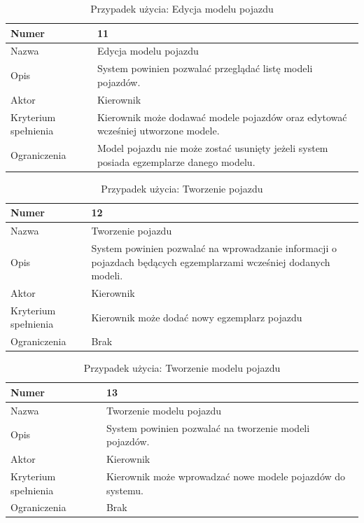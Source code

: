 \documentclass[eng,printmode,openany]{mgr}
\begin{document}
	\begin{table}[H]
		\caption{Przypadek użycia: Edycja modelu pojazdu}
		\begin{tabularx}{\textwidth}{|l|X|}
			\hline
			Numer                & 11  \\ \hline
			Nazwa                & Edycja modelu pojazdu \\ \hline
			Opis                 & System powinien pozwalać przeglądać listę modeli pojazdów. \\ \hline
			Aktor                & Kierownik \\ \hline
			Kryterium spełnienia & Kierownik może dodawać modele pojazdów oraz edytować wcześniej utworzone modele. \\ \hline
			Ograniczenia         & Model pojazdu nie może zostać usunięty jeżeli system posiada egzemplarze danego modelu. \\ \hline
		\end{tabularx}
	\end{table}
	
	\begin{table}[H]
		\caption{Przypadek użycia: Tworzenie pojazdu}
		\begin{tabularx}{\textwidth}{|l|X|}
			\hline
			Numer                & 12  \\ \hline
			Nazwa                & Tworzenie pojazdu \\ \hline
			Opis                 & System powinien pozwalać na wprowadzanie informacji o pojazdach będących egzemplarzami wcześniej dodanych modeli. \\ \hline
			Aktor                & Kierownik \\ \hline
			Kryterium spełnienia & Kierownik może dodać nowy egzemplarz pojazdu  \\ \hline
			Ograniczenia         & Brak  \\ \hline
		\end{tabularx}
	\end{table}
	
	\begin{table}[H]
		\caption{Przypadek użycia: Tworzenie modelu pojazdu}
		\begin{tabularx}{\textwidth}{|l|X|}
			\hline
			Numer                & 13  \\ \hline
			Nazwa                & Tworzenie modelu pojazdu \\ \hline
			Opis                 & System powinien pozwalać na tworzenie modeli pojazdów. \\ \hline
			Aktor                & Kierownik \\ \hline
			Kryterium spełnienia & Kierownik może wprowadzać nowe modele pojazdów do systemu. \\ \hline
			Ograniczenia         & Brak  \\ \hline
		\end{tabularx}
	\end{table}
	
\end{document}

